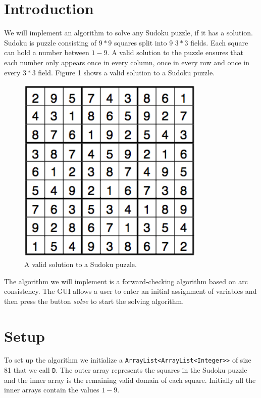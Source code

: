 \section{Introduction}
We will implement an algorithm to solve any Sudoku puzzle, if it has a solution. Sudoku is puzzle consisting of $9*9$ squares split into 9 $3*3$ fields. Each square can hold a number between $1-9$. A valid solution to the puzzle ensures that each number only appears once in every column, once in every row and once in every $3*3$ field. Figure 1 shows a valid solution to a Sudoku puzzle. 
\begin{figure}[h]
\centering
\includegraphics[width=9cm]{Sudoku.png}
\caption{A valid solution to a Sudoku puzzle.}
\end{figure}

\noindent The algorithm we will implement is a forward-checking algorithm based on arc consistency. The GUI allows a user to enter an initial assignment of variables and then press the button \textit{solve} to start the solving algorithm.

\section{Setup}
To set up the algorithm we initialize a \texttt{ArrayList<ArrayList<Integer>>} of size 81 that we call \texttt{D}. The outer array represents the squares in the Sudoku puzzle and the inner array is the remaining valid domain of each square. Initially all the inner arrays contain the values $1-9$. 

